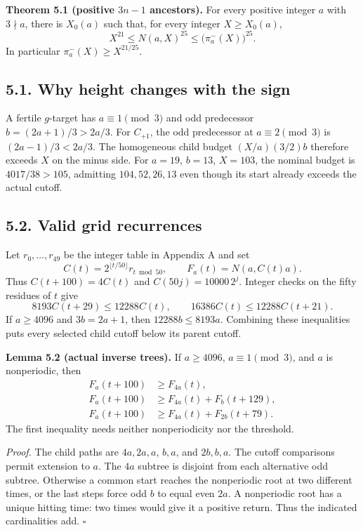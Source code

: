 \documentclass[11pt,a4paper]{article}
\begin{document}
\textbf{Theorem 5.1 (positive \(3n-1\) ancestors).} For every positive
integer \(a\) with \(3\nmid a\), there is \(X_0(a)\) such that, for
every integer \(X\ge X_0(a)\), \[
X^{21}\le N(a,X)^{25}\le\bigl(\pi^-_a(X)\bigr)^{25}.
\tag{5.1}
\] In particular \(\pi^-_a(X)\ge X^{21/25}\).

\subsection{5.1. Why height changes with the
sign}\label{why-height-changes-with-the-sign}

A fertile \(g\)-target has \(a\equiv1\pmod3\) and odd predecessor
\(b=(2a+1)/3>2a/3\). For \(C_{+1}\), the odd predecessor at
\(a\equiv2\pmod3\) is \((2a-1)/3<2a/3\). The homogeneous child budget
\((X/a)(3/2)b\) therefore exceeds \(X\) on the minus side. For \(a=19\),
\(b=13\), \(X=103\), the nominal budget is \(4017/38>105\), admitting
\(104,52,26,13\) even though its start already exceeds the actual
cutoff.

\subsection{5.2. Valid grid recurrences}\label{valid-grid-recurrences}

Let \(r_0,\ldots,r_{49}\) be the integer table in Appendix A and set \[
C(t)=2^{\lfloor t/50\rfloor}r_{t\bmod50},\qquad
F_a(t)=N(a,C(t)a).
\] Thus \(C(t+100)=4C(t)\) and \(C(50j)=10000\,2^j\). Integer checks on
the fifty residues of \(t\) give \[
8193C(t+29)\le12288C(t),\qquad
16386C(t)\le12288C(t+21).
\tag{5.2}
\] If \(a\ge4096\) and \(3b=2a+1\), then \(12288b\le8193a\). Combining
these inequalities puts every selected child cutoff below its parent
cutoff.

\textbf{Lemma 5.2 (actual inverse trees).} If \(a\ge4096\),
\(a\equiv1\pmod3\), and \(a\) is nonperiodic, then \[
\begin{aligned}
F_a(t+100)&\ge F_{4a}(t),\\
F_a(t+100)&\ge F_{4a}(t)+F_b(t+129),\\
F_a(t+100)&\ge F_{4a}(t)+F_{2b}(t+79).
\end{aligned}
\tag{5.3}
\] The first inequality needs neither nonperiodicity nor the threshold.

\emph{Proof.} The child paths are \(4a,2a,a\), \(b,a\), and \(2b,b,a\).
The cutoff comparisons permit extension to \(a\). The \(4a\) subtree is
disjoint from each alternative odd subtree. Otherwise a common start
reaches the nonperiodic root at two different times, or the last steps
force odd \(b\) to equal even \(2a\). A nonperiodic root has a unique
hitting time: two times would give it a positive return. Thus the
indicated cardinalities add. \(\square\)
\end{document}
